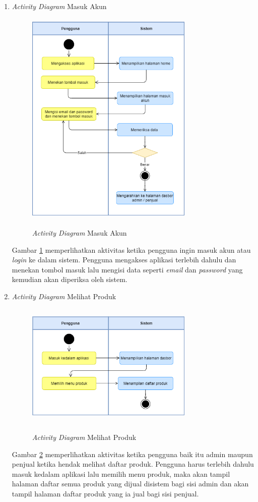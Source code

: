 \newpage

\begin{enumerate}
	\item \textit{Activity Diagram} Masuk Akun
	\begin{figure}[H]
		\centering
		{\includegraphics [width = 8cm, height= 10.5cm]{gambar/activity diagram/masuk akun}}
		\caption{\textit{Activity Diagram} Masuk Akun}
		\label{masuk akun}
	\end{figure}
	\par Gambar \ref*{masuk akun} memperlihatkan aktivitas ketika pengguna ingin masuk akun atau \textit{login} ke dalam sistem. Pengguna mengakses aplikasi terlebih dahulu dan menekan tombol masuk lalu mengisi data seperti \textit{email} dan \textit{password} yang kemudian akan diperiksa oleh sistem.

	\item \textit{Activity Diagram} Melihat Produk
	\begin{figure}[H]
		\centering
		{\includegraphics [width = 8cm, height= 6cm]{gambar/activity diagram/lihat produk}}
		\caption{\textit{Activity Diagram} Melihat Produk}
		\label{lihat produk}
	\end{figure}
	\par Gambar \ref*{lihat produk} memperlihatkan aktivitas ketika pengguna baik itu admin maupun penjual ketika hendak melihat daftar produk. Pengguna harus terlebih dahulu masuk kedalam aplikasi lalu memilih menu produk, maka akan tampil halaman daftar semua produk yang dijual disistem bagi sisi admin dan akan tampil halaman daftar produk yang ia jual bagi sisi penjual.


\end{enumerate}
